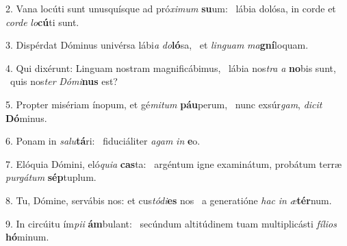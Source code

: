 2. Vana locúti sunt unusquísque ad pró\textit{xi}\textit{mum} \textbf{su}um: \ast\  lábia dolósa, in corde et \textit{cor}\textit{de} \textit{lo}\textbf{cú}ti sunt.\

3. Dispérdat Dóminus univérsa lábi\textit{a} \textit{do}\textbf{ló}sa, \ast\  et \textit{lin}\textit{guam} \textit{ma}\textbf{gní}loquam.\

4. Qui dixérunt: Linguam nostram magnificábimus, \dag\  lábia nos\textit{tra} \textit{a} \textbf{no}bis sunt, \ast\  quis nos\textit{ter} \textit{Dó}\textit{mi}\textbf{nus} est?\

5. Propter misériam ínopum, et gé\textit{mi}\textit{tum} \textbf{páu}perum, \ast\  nunc exsúr\textit{gam}, \textit{di}\textit{cit} \textbf{Dó}minus.\

6. Ponam in \textit{sa}\textit{lu}\textbf{tá}ri: \ast\  fiduciáliter \textit{a}\textit{gam} \textit{in} \textbf{e}o.\

7. Elóquia Dómini, eló\textit{qui}\textit{a} \textbf{cas}ta: \ast\  argéntum igne examinátum, probátum terræ \textit{pur}\textit{gá}\textit{tum} \textbf{sép}tuplum.\

8. Tu, Dómine, servábis nos: et cus\textit{tó}\textit{di}\textbf{es} nos \ast\  a generatióne \textit{hac} \textit{in} \textit{æ}\textbf{tér}num.\

9. In circúitu ím\textit{pi}\textit{i} \textbf{ám}bulant: \ast\  secúndum altitúdinem tuam multiplicásti \textit{fí}\textit{li}\textit{os} \textbf{hó}minum.\

